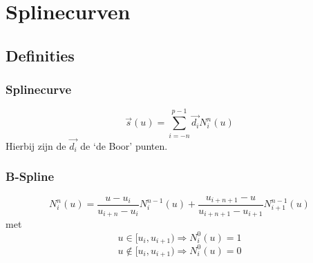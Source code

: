 \documentclass[computergesteund_ontwerp_van_curven_en_oppervlakken.tex]{subfiles}
\begin{document}
\chapter{Splinecurven}
\section{Definities}
\subsection{Splinecurve}
\[
\vec{s}(u) = \sum_{i=-n}^{p-1}\vec{d_i}N_{i}^{n}(u)
\]
Hierbij zijn de $\vec{d_i}$ de `de Boor' punten.

\subsection{B-Spline}
\[
N_{i}^{n}(u)
= \frac{u-u_i}{u_{i+n}-u_i}					N_{i}^{n-1}(u)
+ \frac{u_{i+n+1}-u}{u_{i+n+1}-u_{i+1}}		N_{i+1}^{n-1}(u)
\]
met
\[
u \in [u_i,u_{i+1}) \Rightarrow N_{i}^{0}(u) = 1
\]
\[
u \not\in [u_i,u_{i+1}) \Rightarrow N_{i}^{0}(u) = 0
\]
\end{document}
